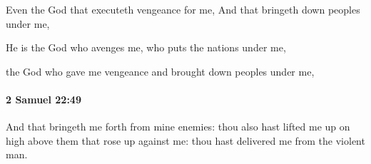 			\begin{versebox}
					\item[BHS] 
					\item[ASV] Even the God that executeth vengeance for me, And that bringeth down peoples under me,
					\item[NIV] He is the God who avenges me, who puts the nations under me,
					\item[NRSV] the God who gave me vengeance and brought down peoples under me,
			\end{versebox}

		\paragraph{2 Samuel 22:49} %
			\label{2SAMUEL-22-49}

			And that bringeth me forth from mine enemies: thou also hast lifted me up on high above them that rose up against me: thou hast delivered me from the violent man.

